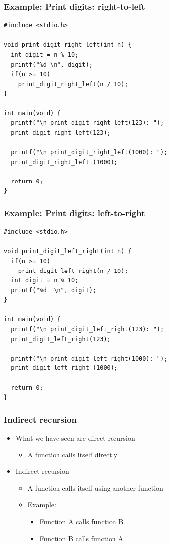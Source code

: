 \documentclass{../c-lecture}
\begin{document}
\begin{frame}[fragile]
  \frametitle{Example: Print digits: right-to-left}
  \scriptsize
  \begin{verbatim}
#include <stdio.h>

void print_digit_right_left(int n) {
  int digit = n % 10;
  printf("%d \n", digit);
  if(n >= 10)
    print_digit_right_left(n / 10);
}

int main(void) {
  printf("\n print_digit_right_left(123): ");
  print_digit_right_left(123);

  printf("\n print_digit_right_left(1000): ");
  print_digit_right_left (1000);

  return 0;
}
  \end{verbatim}
\end{frame}

\begin{frame}[fragile]
  \frametitle{Example: Print digits: left-to-right}
  \scriptsize
  \begin{verbatim}
#include <stdio.h>

void print_digit_left_right(int n) {
  if(n >= 10)
    print_digit_left_right(n / 10);
  int digit = n % 10;
  printf("%d  \n", digit);
}

int main(void) {
  printf("\n print_digit_left_right(123): ");
  print_digit_left_right(123);

  printf("\n print_digit_left_right(1000): ");
  print_digit_left_right (1000);

  return 0;
}
  \end{verbatim}
\end{frame}

\begin{frame}
  \frametitle{Indirect recursion}
  \begin{itemize}
    \item What we have seen are direct recursion
    \begin{itemize}
      \item A function calls itself directly
    \end{itemize}
    \item Indirect recursion
    \begin{itemize}
      \item A function calls itself using another function
      \item Example:
      \begin{itemize}
        \item Function A calls function B
        \item Function B calls function A
      \end{itemize}
    \end{itemize}
  \end{itemize}
\end{frame}
\end{document}
